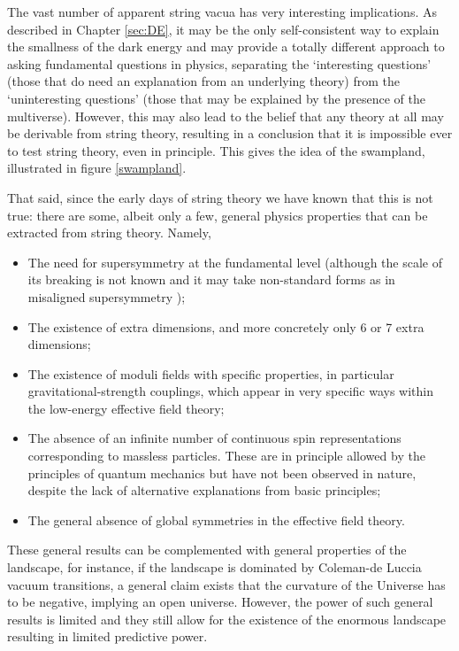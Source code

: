 The vast number of apparent string vacua has very interesting implications. As described in Chapter \ref{sec:DE}, it may be the only self-consistent way to explain the smallness of the dark energy and may provide a totally different approach to asking fundamental questions in physics, separating the `interesting questions' (those that do need an explanation from an underlying theory) from the `uninteresting questions' (those that may be explained by the presence of the multiverse). However, this may also lead to the belief that any theory at all may be derivable from string theory, resulting in a conclusion that it is impossible ever to test string theory, even in principle. This gives the idea of the swampland, illustrated in figure \ref{swampland}.

That said, since the early days of string theory we have known that this is not true: there are some, albeit only a few, general physics properties that can be extracted from string theory. Namely,
\begin{itemize}
\item The need for supersymmetry at the fundamental level (although the scale of its breaking is not known and it may take non-standard forms as in misaligned supersymmetry \cite{Dienes:1994np});
\item
 The existence of extra dimensions, and more concretely only 6 or 7 extra dimensions; 
 \item 
 The existence of moduli fields with specific properties, in particular gravitational-strength couplings, 
 which appear in very specific ways within the low-energy effective field theory; 
 \item The absence of an infinite number of continuous spin representations corresponding to massless particles. These are in principle allowed by the principles of quantum mechanics but have not been observed in nature, despite the lack of alternative explanations from basic principles;
 \item The general absence of global symmetries in the effective field theory.
\end{itemize}

These general results can be complemented with general properties of the landscape, for instance, if the landscape is dominated by Coleman-de Luccia vacuum transitions, a general claim exists that the curvature of the Universe has to be negative, implying an open universe. However, the power of such general results is limited and they still allow for the existence of the enormous landscape resulting in limited predictive power.

